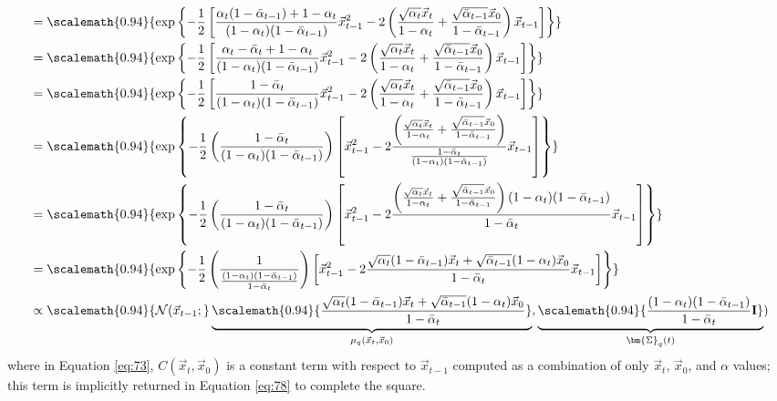 \begin{align}
&= \scalemath{0.94}{\text{exp}\left\{-\frac{1}{2}\left[\frac{\alpha_t(1-\bar\alpha_{t-1}) + 1 - \alpha_t}{(1 - \alpha_t)(1 - \bar\alpha_{t-1})}\vec{x}_{t-1}^2 - 2\left(\frac{\sqrt{\alpha_t}\vec{x}_{t}}{1 - \alpha_t} + \frac{\sqrt{\bar\alpha_{t-1}}\vec{x}_0}{1 - \bar\alpha_{t-1}}\right)\vec{x}_{t-1}\right]\right\}}\\
&= \scalemath{0.94}{\text{exp}\left\{-\frac{1}{2}\left[\frac{\alpha_t-\bar\alpha_{t} + 1 - \alpha_t}{(1 - \alpha_t)(1 - \bar\alpha_{t-1})}\vec{x}_{t-1}^2 - 2\left(\frac{\sqrt{\alpha_t}\vec{x}_{t}}{1 - \alpha_t} + \frac{\sqrt{\bar\alpha_{t-1}}\vec{x}_0}{1 - \bar\alpha_{t-1}}\right)\vec{x}_{t-1}\right]\right\}}\\
&= \scalemath{0.94}{\text{exp}\left\{-\frac{1}{2}\left[\frac{1 -\bar\alpha_{t}}{(1 - \alpha_t)(1 - \bar\alpha_{t-1})}\vec{x}_{t-1}^2 - 2\left(\frac{\sqrt{\alpha_t}\vec{x}_{t}}{1 - \alpha_t} + \frac{\sqrt{\bar\alpha_{t-1}}\vec{x}_0}{1 - \bar\alpha_{t-1}}\right)\vec{x}_{t-1}\right]\right\}}\\
&= \scalemath{0.94}{\text{exp}\left\{-\frac{1}{2}\left(\frac{1 -\bar\alpha_{t}}{(1 - \alpha_t)(1 - \bar\alpha_{t-1})}\right)\left[\vec{x}_{t-1}^2 - 2\frac{\left(\frac{\sqrt{\alpha_t}\vec{x}_{t}}{1 - \alpha_t} + \frac{\sqrt{\bar\alpha_{t-1}}\vec{x}_0}{1 - \bar\alpha_{t-1}}\right)}{\frac{1 -\bar\alpha_{t}}{(1 - \alpha_t)(1 - \bar\alpha_{t-1})}}\vec{x}_{t-1}\right]\right\}}\\
&= \scalemath{0.94}{\text{exp}\left\{-\frac{1}{2}\left(\frac{1 -\bar\alpha_{t}}{(1 - \alpha_t)(1 - \bar\alpha_{t-1})}\right)\left[\vec{x}_{t-1}^2 - 2\frac{\left(\frac{\sqrt{\alpha_t}\vec{x}_{t}}{1 - \alpha_t} + \frac{\sqrt{\bar\alpha_{t-1}}\vec{x}_0}{1 - \bar\alpha_{t-1}}\right)(1 - \alpha_t)(1 - \bar\alpha_{t-1})}{1 -\bar\alpha_{t}}\vec{x}_{t-1}\right]\right\}}\\
&= \scalemath{0.94}{\text{exp}\left\{-\frac{1}{2}\left(\frac{1}{\frac{(1 - \alpha_t)(1 - \bar\alpha_{t-1})}{1 -\bar\alpha_{t}}}\right)\left[\vec{x}_{t-1}^2 - 2\frac{\sqrt{\alpha_t}(1-\bar\alpha_{t-1})\vec{x}_{t} + \sqrt{\bar\alpha_{t-1}}(1-\alpha_t)\vec{x}_0}{1 -\bar\alpha_{t}}\vec{x}_{t-1}\right]\right\}}\\
&\propto \scalemath{0.94}{\mathcal{N}(\vec{x}_{t-1} ;} \underbrace{\scalemath{0.94}{\frac{\sqrt{\alpha_t}(1-\bar\alpha_{t-1})\vec{x}_{t} + \sqrt{\bar\alpha_{t-1}}(1-\alpha_t)\vec{x}_0}{1 -\bar\alpha_{t}}}}_{\mu_q(\vec{x}_t, \vec{x}_0)}, \underbrace{\scalemath{0.94}{\frac{(1 - \alpha_t)(1 - \bar\alpha_{t-1})}{1 -\bar\alpha_{t}}\textbf{I}}}_{\bm{\Sigma}_q(t)}) \label{eq:78}
\end{align}
\endgroup
where in Equation \ref{eq:73}, $C(\vec{x}_t, \vec{x}_0)$ is a constant term with respect to $\vec{x}_{t-1}$ computed as a combination of only $\vec{x}_t$, $\vec{x}_0$, and $\alpha$ values; this term is implicitly returned in Equation \ref{eq:78} to complete the square.

